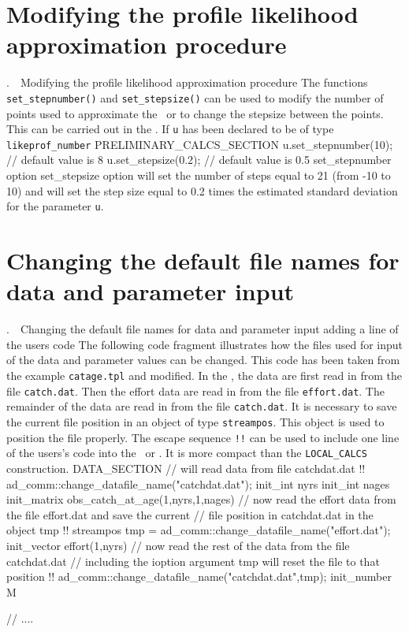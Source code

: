 \documentclass[12pt]{book}
\makeatletter
\def\mysection#1{\section{#1}{\bigbf \medbreak\noindent\number\c@chapter.\number\c@section\ \ #1\medbreak}}
\makeatother
\begin{document}
 
\mysection{Modifying the profile likelihood approximation procedure}
The functions  {\tt set\_stepnumber()} and 
{\tt set\_stepsize()} can be used to modify the number of
points used to approximate the \apl\ or to change
the stepsize between the points. This can be carried out in the
 \PCS. If {\tt u} has been declared to be of type {\tt likeprof\_number}
\beginexample
PRELIMINARY_CALCS_SECTION
  u.set_stepnumber(10);   // default value is 8
  u.set_stepsize(0.2);    // default value is 0.5
\endexample
{}
 {set\_stepnumber option}
 {set\_stepsize option}
\noindent will set the number of steps
equal to 21 (from -10 to 10) and 
will set the step size equal to 0.2 times the estimated standard
deviation for the parameter {\tt u}.
\mysection{Changing the default file names for data and parameter input}
 {adding a line of the users code}
The following code fragment illustrates how the files used for input 
of the data and parameter values can be changed. This code has been taken from
the example {\tt catage.tpl} and modified. In the \DS, the data are first read 
in from the file {\tt catch.dat}. Then the effort data are read in from the
file {\tt effort.dat}. The remainder of the data are read in from the
file {\tt catch.dat}. It is necessary to save the current file position in
an object of type {\tt streampos}. This object is used to 
position the file properly.
The escape sequence {\tt!!} can be used to include one line of the users's
code into the \DS\ or \PS. It is more compact than the {\tt LOCAL\_CALCS}
construction.
\beginexample
DATA_SECTION
 // will read data from file catchdat.dat
 !! ad_comm::change_datafile_name("catchdat.dat");
  init_int nyrs  
  init_int nages
  init_matrix obs_catch_at_age(1,nyrs,1,nages)
 // now read the effort data from the file effort.dat and save the current
 // file position in catchdat.dat in the object tmp
 !! streampos tmp = ad_comm::change_datafile_name("effort.dat");
  init_vector effort(1,nyrs)
 // now read the rest of the data from the file catchdat.dat 
 // including the ioption argument tmp will reset the file to that position
 !! ad_comm::change_datafile_name("catchdat.dat",tmp);
  init_number M

 // ....
\end{document}

